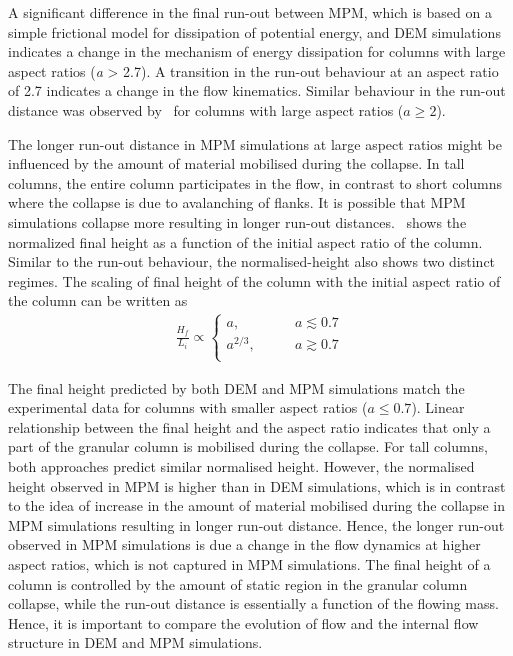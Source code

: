 A significant difference in the final run-out between MPM, which is based on a 
simple frictional model for dissipation of potential energy, and DEM 
simulations indicates a change in the mechanism of energy 
dissipation for columns with large aspect ratios (\textit{a} > 
2.7). A transition in the run-out behaviour at an aspect ratio of 2.7 indicates 
a change in the flow kinematics. Similar behaviour in the run-out distance was 
observed by~\citet{Bandara2013} for columns with large aspect ratios ($a \ge 
2$).

The longer run-out distance in MPM simulations at large aspect ratios might be 
influenced by the amount of material mobilised during the collapse. In tall 
columns, the entire column participates in the flow, in contrast to short 
columns where the collapse is due to avalanching of 
flanks. It is possible that MPM simulations 
collapse more resulting in longer run-out distances.~ shows 
the normalized final height as a function of the initial aspect ratio of the 
column. Similar to the run-out behaviour, the normalised-height also shows two 
distinct regimes. The scaling of final height of the column with the initial 
aspect ratio of the column can be written as
\begin{align}
\frac{H_{\textit{f}}}{L_{\textit{i}}} \propto  
\begin{cases}
\textit{a}, \qquad & \textit{a}\lesssim0.7 \\
\textit{a}^{2/3}, \qquad & \textit{a}\gtrsim0.7 \\
\end{cases}
\end{align} 

The final height predicted by both DEM and MPM simulations match the 
experimental data for columns with smaller aspect ratios ($a \le 0.7$). Linear 
relationship between the final height and the aspect ratio indicates that only 
a part of the granular column is mobilised during the collapse. For tall 
columns, both approaches predict similar normalised height. However, the 
normalised height observed in MPM is higher than in DEM simulations, which is 
in contrast to the idea of increase in the amount of material mobilised during 
the collapse in MPM simulations resulting in longer run-out distance. Hence, 
the longer run-out observed in MPM simulations is due a change in the 
flow dynamics at higher aspect ratios, which is not captured in MPM 
simulations. The final height of a column is controlled by the amount of static 
region in the granular column collapse, while the run-out distance is 
essentially a function of the flowing mass. Hence, it is important to compare 
the evolution of flow and the internal flow structure in DEM and MPM 
simulations.

